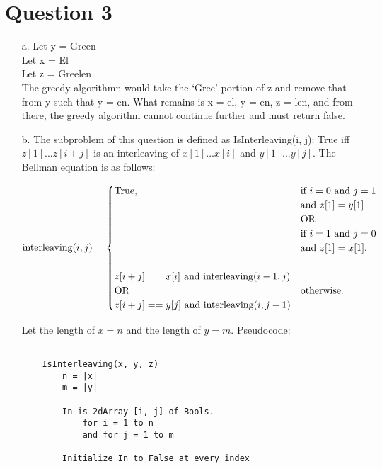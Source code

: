 \documentclass[12pt]{article}
\begin{document}
\section*{Question 3} 
\begin{enumerate}
    \item[a.] Let y = Green\\
              Let x = El\\
              Let z = Greelen\\
 
              The greedy algorithmn would take the `Gree' portion of z and remove that from y such that y = en.
              What remains is x = el, y = en, z = len, and from there, the greedy algorithm cannot continue further
              and must return false.

    \item[b.] The subproblem of this question is defined as IsInterleaving(i, j): True iff $z[1] ... z[i+j]$ is an interleaving of $x[1] ... x[i]$ and $y[1] ... y[j]$. The Bellman equation is as follows:
    
    \begin{equation*}
        \text{interleaving}(i,j)=\begin{cases}
    \text{True}, & \text{if $i = 0$ and $j = 1$} \\ & \text{and $z[1] = y[1]$} \\ & \text{OR} \\ & \text{if $i = 1$ and $j = 0$} \\ & \text{and $z[1] = x[1]$}.\\ \\
    z[i+j] == x[i] \newline \text{ and interleaving}(i-1, j) \\ \text{OR} & \text{otherwise}. \\ z[i+j] == y[j] \text{ and interleaving}(i, j-1)
    \end{cases}
    \end{equation*}
    
    Let the length of $x = n$ and the length of $y = m$. Pseudocode: 
    \begin{verbatim}

    IsInterleaving(x, y, z)
        n = |x|
        m = |y|

        In is 2dArray [i, j] of Bools.
            for i = 1 to n
            and for j = 1 to m
        
        Initialize In to False at every index
        

\end{verbatim}
\end{enumerate}
\end{document}
